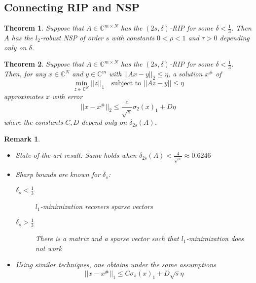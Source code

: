 \documentclass[10pt,a4paper]{article}
\theoremstyle{thmstyle}
\newtheorem{theorem}{Theorem}
\newtheorem{remark}{Remark}
\begin{document}
\subsection{Connecting RIP and NSP}

\begin{theorem}
  Suppose that $A \in \mathbb{C}^{m \times N}$ has the $(2s, \delta)$-RIP for some $\delta < \frac{1}{3}$.
  Then $A$ has the $l_{2}$-robust NSP of order $s$ with constants $0 < \rho < 1$ and $\tau > 0$ depending only on $\delta$.
\end{theorem}

\begin{theorem}
  Suppose that $A \in \mathbb{C}^{m \times N}$ has the $(2s, \delta)$-RIP for some $\delta < \frac{1}{3}$.
  Then, for any $x \in \mathbb{C}^{N}$ and $y \in \mathbb{C}^{m}$ with $||Ax - y||_{2} \le \eta$, a solution $x^{\#}$ of
  \begin{equation*}
    \min_{z \in \mathbb{C}^{N}} ||z||_{1} \quad \text{subject to $||Az - y|| \le \eta$}
  \end{equation*}
  approximates $x$ with error
  \begin{equation*}
    ||x - x^{\#}||_{2} \le \frac{c}{\sqrt{s}} \sigma_{2}(x)_{1} + D\eta
  \end{equation*}
  where the constants $C, D$ depend only on $\delta_{2s}(A)$.
\end{theorem}

\begin{remark}
  \begin{itemize}
  \item State-of-the-art result: Same holds when $\delta_{2s}(A) < \frac{4}{\sqrt{\pi}} \approx 0.6246$
  \item Sharp bounds are known for $\delta_{s}$:
    \begin{description}
    \item[$\delta_{s} < \frac{1}{3}$] $l_{1}$-minimization recovers sparse vectors
    \item[$\delta_{s} > \frac{1}{3}$] There is a matrix and a sparse vector such that $l_{1}$-minimization does not work
    \end{description}
  \item Using similar techniques, one obtains under the same assumptions
    \begin{equation*}
      ||x - x^{\#}||_{1} \le C \sigma_{s}(x)_{1} + D \sqrt{s} \eta
    \end{equation*}
  \end{itemize}
\end{remark}
\end{document}
